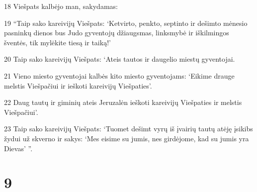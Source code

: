 \par 18 Viešpats kalbėjo man, sakydamas: 
\par 19 “Taip sako kareivijų Viešpats: ‘Ketvirto, penkto, septinto ir dešimto mėnesio pasninkų dienos bus Judo gyventojų džiaugsmas, linksmybė ir iškilmingos šventės, tik mylėkite tiesą ir taiką!’ 
\par 20 Taip sako kareivijų Viešpats: ‘Ateis tautos ir daugelio miestų gyventojai. 
\par 21 Vieno miesto gyventojai kalbės kito miesto gyventojams: ‘Eikime drauge melstis Viešpačiui ir ieškoti kareivijų Viešpaties’. 
\par 22 Daug tautų ir giminių ateis Jeruzalėn ieškoti kareivijų Viešpaties ir melstis Viešpačiui’. 
\par 23 Taip sako kareivijų Viešpats: ‘Tuomet dešimt vyrų iš įvairių tautų atėję įsikibs žydui už skverno ir sakys: ‘Mes eisime su jumis, nes girdėjome, kad su jumis yra Dievas’ ”.



\chapter{9}


